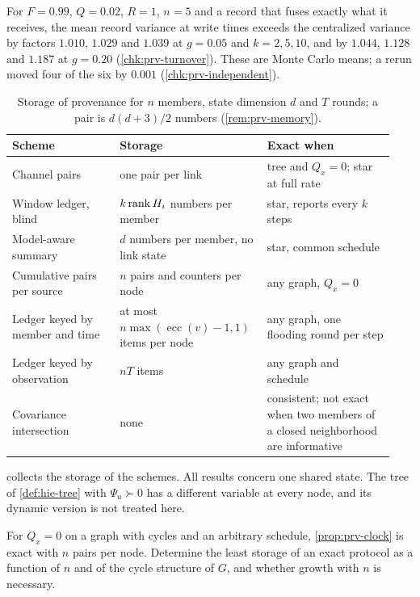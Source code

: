 \begin{observation}\label{obs:prv-turnover}
For $F=0.99$, $Q=0.02$, $R=1$, $n=5$ and a record that fuses exactly what it receives, the mean record variance at write times exceeds the centralized variance by factors $1.010$, $1.029$ and $1.039$ at $g=0.05$ and $k=2,5,10$, and by $1.044$, $1.128$ and $1.187$ at $g=0.20$ (\cref{chk:prv-turnover}). These are Monte Carlo means; a rerun moved four of the six by $0.001$ (\cref{chk:prv-independent}).
\end{observation}

\begin{table}[tb]
\centering
\caption{Storage of provenance for $n$ members, state dimension $d$ and $T$ rounds; a pair is $d(d+3)/2$ numbers (\cref{rem:prv-memory}).}\label{tab:prv-memory}
\begin{tabular}{@{}>{\raggedright\arraybackslash}p{0.27\linewidth}>{\raggedright\arraybackslash}p{0.35\linewidth}>{\raggedright\arraybackslash}p{0.32\linewidth}@{}}
\toprule
Scheme & Storage & Exact when\\
\midrule
Channel pairs & one pair per link & tree and $Q_x=0$; star at full rate\\
Window ledger, blind & $k\operatorname{rank} H_i$ numbers per member & star, reports every $k$ steps\\
Model-aware summary & $d$ numbers per member, no link state & star, common schedule\\
Cumulative pairs per source & $n$ pairs and counters per node & any graph, $Q_x=0$\\
Ledger keyed by member and time & at most $n\max(\operatorname{ecc}(v)-1,1)$ items per node & any graph, one flooding round per step\\
Ledger keyed by observation & $nT$ items & any graph and schedule\\
Covariance intersection & none & consistent; not exact when two members of a closed neighborhood are informative\\
\bottomrule
\end{tabular}
\end{table}

 collects the storage of the schemes. All results concern one shared state. The tree of \cref{def:hie-tree} with $\Psi_u\succ0$ has a different variable at every node, and its dynamic version is not treated here.

\begin{openproblem}\label{open:prv-minimal}
For $Q_x=0$ on a graph with cycles and an arbitrary schedule, \cref{prop:prv-clock} is exact with $n$ pairs per node. Determine the least storage of an exact protocol as a function of $n$ and of the cycle structure of $G$, and whether growth with $n$ is necessary.
\end{openproblem}

